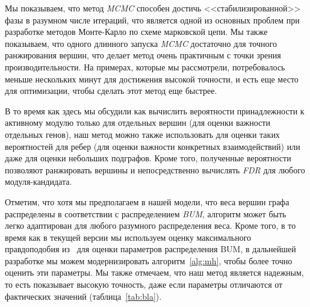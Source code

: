 Мы показываем, что  метод \emph{MCMC} способен достичь <<стабилизированной>>
фазы в разумном числе итераций, что является одной из основных проблем при
разработке методов Монте-Карло по схеме марковской цепи.  Мы также показываем,
что одного длинного запуска \emph{MCMC} достаточно для точного ранжирования
вершин, что делает метод очень практичным с точки зрения производительности.
На примерах, которые мы рассмотрели, потребовалось меньше нескольких минут для
достижения высокой точности, и есть еще место для оптимизации, чтобы сделать
этот метод еще быстрее.

В то время как здесь мы обсудили как вычислить вероятности принадлежности
к активному модулю только для отдельных вершин (для оценки важности отдельных
генов), наш метод можно также использовать для оценки таких вероятностей для
ребер (для оценки важности конкретных взаимодействий) или даже для оценки
небольших подграфов.  Кроме того, полученные вероятности позволяют ранжировать
вершины и непосредственно вычислять \emph{FDR} для любого модуля-кандидата.

Отметим, что хотя мы предполагаем в нашей модели, что веса вершин графа
распределены в соответствии с распределением \emph{BUM}, алгоритм может быть
легко адаптирован для любого разумного распределения веса.  Кроме того, в то
время как в текущей версии мы используем оценку максимального правдоподобия
из~\cite{Beisser2010} для оценки параметров распределения BUM, в дальнейшей
разработке мы можем модернизировать алгоритм~\ref{alg:mh}, чтобы более точно
оценить эти параметры.  Мы также отмечаем, что наш метод является надежным, то
есть показывает высокую точность, даже если параметры отличаются от фактических
значений (таблица~\ref{tab:bla}).





